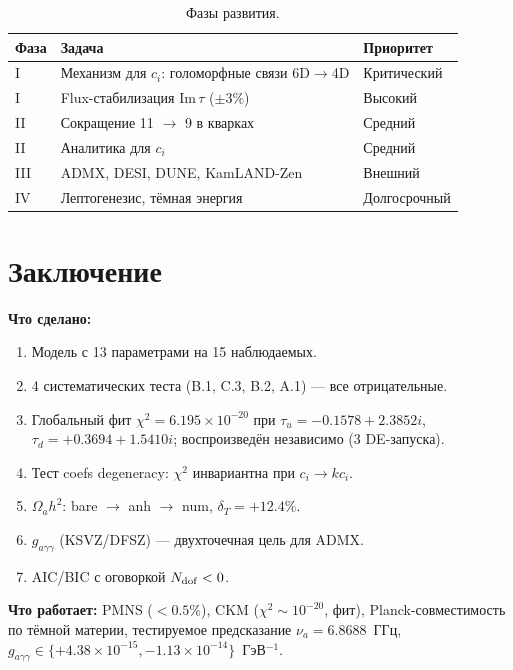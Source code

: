 \documentclass[12pt,a4paper]{article}
\numberwithin{equation}{section}
\begin{document}
\begin{table}[H]
\centering
\caption{Фазы развития.}
\begin{tabular}{p{1cm}p{8cm}p{3cm}}
\toprule
Фаза & Задача & Приоритет \\
\midrule
I & Механизм для $c_i$: голоморфные связи 6D$\to$4D & Критический \\
I & Flux-стабилизация $\mathrm{Im}\,\tau$ ($\pm 3\%$) & Высокий \\
II & Сокращение 11 $\to$ 9 в кварках & Средний \\
II & Аналитика для $c_i$ & Средний \\
III & ADMX, DESI, DUNE, KamLAND-Zen & Внешний \\
IV & Лептогенезис, тёмная энергия & Долгосрочный \\
\bottomrule
\end{tabular}
\end{table}

\section{Заключение}

\textbf{Что сделано:}
\begin{enumerate}[leftmargin=1.5em,itemsep=0.05em]
\item Модель с 13 параметрами на 15 наблюдаемых.
\item 4 систематических теста (B.1, C.3, B.2, A.1) --- все отрицательные.
\item Глобальный фит $\chi^2 = 6.195\times10^{-20}$ при
      $\tau_u = -0.1578+2.3852i$, $\tau_d = +0.3694+1.5410i$;
      воспроизведён независимо (3 DE-запуска).
\item Тест coefs degeneracy: $\chi^2$ инвариантна при $c_i \to kc_i$.
\item $\Omega_a h^2$: bare $\to$ anh $\to$ num, $\delta_T = +12.4\%$.
\item $g_{a\gamma\gamma}$ (KSVZ/DFSZ) --- двухточечная цель для ADMX.
\item AIC/BIC с оговоркой $N_{\rm dof}<0$.
\end{enumerate}

\textbf{Что работает:} PMNS ($<0.5\%$), CKM ($\chi^2 \sim 10^{-20}$, фит),
Planck-совместимость по тёмной материи, тестируемое предсказание
$\nu_a = 6.8688$~ГГц,
$g_{a\gamma\gamma} \in \{+4.38\times10^{-15}, -1.13\times10^{-14}\}$~ГэВ$^{-1}$.
\end{document}
